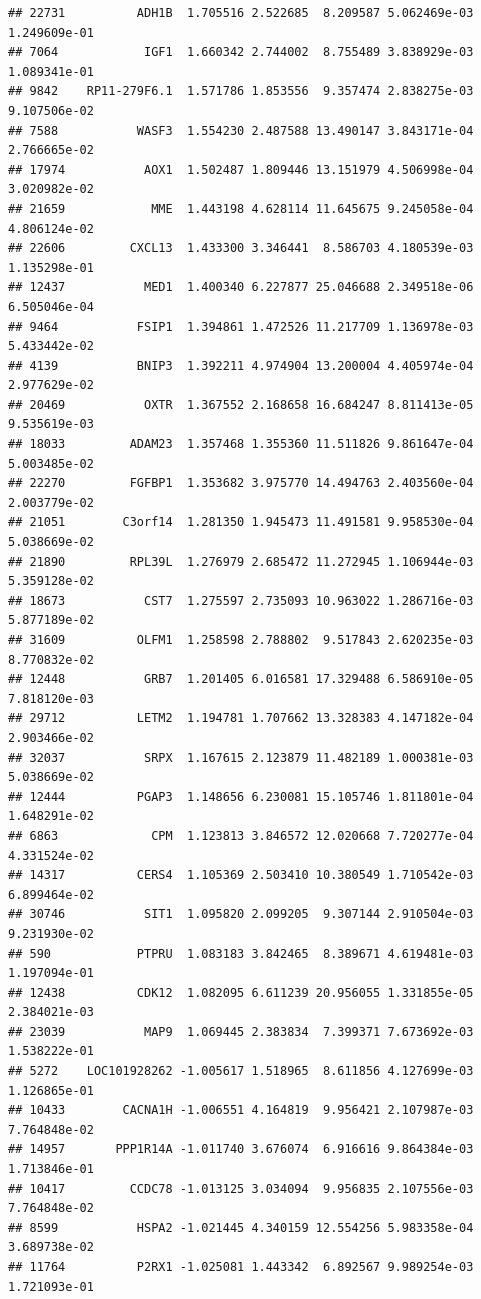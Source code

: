 \documentclass[
]{article}
\begin{document}
\begin{verbatim}
## 22731          ADH1B  1.705516 2.522685  8.209587 5.062469e-03 1.249609e-01
## 7064            IGF1  1.660342 2.744002  8.755489 3.838929e-03 1.089341e-01
## 9842    RP11-279F6.1  1.571786 1.853556  9.357474 2.838275e-03 9.107506e-02
## 7588           WASF3  1.554230 2.487588 13.490147 3.843171e-04 2.766665e-02
## 17974           AOX1  1.502487 1.809446 13.151979 4.506998e-04 3.020982e-02
## 21659            MME  1.443198 4.628114 11.645675 9.245058e-04 4.806124e-02
## 22606         CXCL13  1.433300 3.346441  8.586703 4.180539e-03 1.135298e-01
## 12437           MED1  1.400340 6.227877 25.046688 2.349518e-06 6.505046e-04
## 9464           FSIP1  1.394861 1.472526 11.217709 1.136978e-03 5.433442e-02
## 4139           BNIP3  1.392211 4.974904 13.200004 4.405974e-04 2.977629e-02
## 20469           OXTR  1.367552 2.168658 16.684247 8.811413e-05 9.535619e-03
## 18033         ADAM23  1.357468 1.355360 11.511826 9.861647e-04 5.003485e-02
## 22270         FGFBP1  1.353682 3.975770 14.494763 2.403560e-04 2.003779e-02
## 21051        C3orf14  1.281350 1.945473 11.491581 9.958530e-04 5.038669e-02
## 21890         RPL39L  1.276979 2.685472 11.272945 1.106944e-03 5.359128e-02
## 18673           CST7  1.275597 2.735093 10.963022 1.286716e-03 5.877189e-02
## 31609          OLFM1  1.258598 2.788802  9.517843 2.620235e-03 8.770832e-02
## 12448           GRB7  1.201405 6.016581 17.329488 6.586910e-05 7.818120e-03
## 29712          LETM2  1.194781 1.707662 13.328383 4.147182e-04 2.903466e-02
## 32037           SRPX  1.167615 2.123879 11.482189 1.000381e-03 5.038669e-02
## 12444          PGAP3  1.148656 6.230081 15.105746 1.811801e-04 1.648291e-02
## 6863             CPM  1.123813 3.846572 12.020668 7.720277e-04 4.331524e-02
## 14317          CERS4  1.105369 2.503410 10.380549 1.710542e-03 6.899464e-02
## 30746           SIT1  1.095820 2.099205  9.307144 2.910504e-03 9.231930e-02
## 590            PTPRU  1.083183 3.842465  8.389671 4.619481e-03 1.197094e-01
## 12438          CDK12  1.082095 6.611239 20.956055 1.331855e-05 2.384021e-03
## 23039           MAP9  1.069445 2.383834  7.399371 7.673692e-03 1.538222e-01
## 5272    LOC101928262 -1.005617 1.518965  8.611856 4.127699e-03 1.126865e-01
## 10433        CACNA1H -1.006551 4.164819  9.956421 2.107987e-03 7.764848e-02
## 14957       PPP1R14A -1.011740 3.676074  6.916616 9.864384e-03 1.713846e-01
## 10417         CCDC78 -1.013125 3.034094  9.956835 2.107556e-03 7.764848e-02
## 8599           HSPA2 -1.021445 4.340159 12.554256 5.983358e-04 3.689738e-02
## 11764          P2RX1 -1.025081 1.443342  6.892567 9.989254e-03 1.721093e-01

\end{verbatim}
\end{document}
